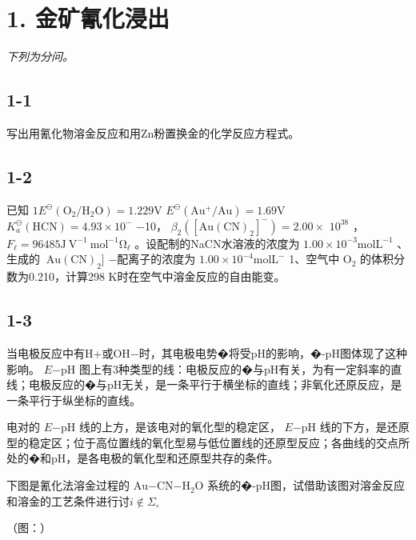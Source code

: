 \section*{1. 金矿氰化浸出}
\textit{下列为分问。}

\subsection*{1-1}
写出⽤氰化物溶⾦反应和⽤Zn粉置换⾦的化学反应⽅程式。

\subsection*{1-2}
已知 $1 E ^ { \ominus } ( \mathrm { O } _ { 2 } / \mathrm { H } _ { 2 } \mathrm { O } ) = 1 . 2 2 9 \mathrm { V }$ $E ^ { \ominus } ( \mathrm { A u ^ { + } / A u } ) = 1 . 6 9 \mathrm { V }$ $K _ { a } ^ { \ominus } ( \mathrm { H C N } ) = 4 . 9 3 \times 1 0 ^ { - }$ −10， $\beta _ { 2 } ( \mathrm { [ A u ( C N ) _ { 2 } ] ^ { - } } ) = 2 . 0 0 \times$ $1 0 ^ { 3 8 }$ ， $F _ { \mathrm { \ell } } = 9 6 4 8 5 \mathrm { J \ V ^ { - 1 } \ m o l ^ { - 1 } \Omega _ { \mathrm { \ell } } }$ 。设配制的NaCN⽔溶液的浓度为 $1 . 0 0 { \times } 1 0 ^ { - 3 } \mathrm { m o l } \mathrm { L } ^ { - 1 }$ 、⽣成的 $\mathrm { \ A u ( C N ) _ { 2 } ] }$ −配离⼦的浓度为 $1 . 0 0 { \times } 1 0 ^ { - 4 } \mathrm { m o l } \mathrm { L } ^ { - }$ 1、空⽓中 $\mathrm { O _ { 2 } }$ 的体积分数为0.210，计算298 K时在空⽓中溶⾦反应的⾃由能变。

\subsection*{1-3}
当电极反应中有H+或OH−时，其电极电势�将受pH的影响，�-pH图体现了这种影响。 $E \mathrm { - p H }$ 图上有3种类型的线：电极反应的�与pH有关，为有⼀定斜率的直线；电极反应的�与pH⽆关，是⼀条平⾏于横坐标的直线；⾮氧化还原反应，是⼀条平⾏于纵坐标的直线。

电对的 $E \mathrm { - p H }$ 线的上⽅，是该电对的氧化型的稳定区， $E \mathrm { - p H }$ 线的下⽅，是还原型的稳定区；位于⾼位置线的氧化型易与低位置线的还原型反应；各曲线的交点所处的�和pH，是各电极的氧化型和还原型共存的条件。

下图是氰化法溶⾦过程的 $\mathrm { A u \mathrm { - C N \mathrm { - } H _ { 2 } O } }$ 系统的�-pH图，试借助该图对溶⾦反应和溶⾦的⼯艺条件进⾏讨$i \not \in \Sigma _ { \circ }$

（图：）
